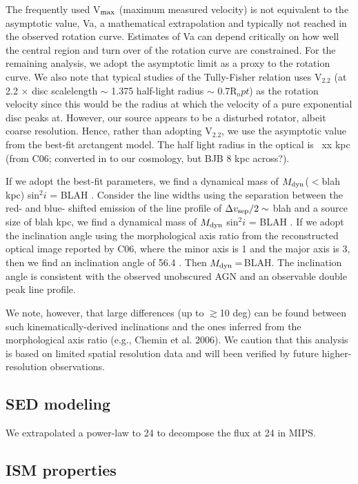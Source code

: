 \documentclass[]{emulateapj}
\begin{document}
The frequently used V$_{\rm max}$ (maximum measured velocity) is not equivalent to the
asymptotic value, Va, a mathematical extrapolation and typically not reached in
the observed rotation curve. Estimates of Va can depend critically on how well
the central region and turn over of the rotation curve are constrained. For the
remaining analysis, we adopt the asymptotic limit as a proxy to the rotation
curve. We also note that typical studies of the Tully-Fisher relation uses V$_2.2$ (at 2.2 $\times$ disc scalelength $\sim$ 1.375 half-light radius $\sim$ 0.7R$_opt$) as the rotation
velocity since this would be the radius at which the velocity of a pure
exponential disc peaks at. However, our source appears to be a disturbed
rotator, albeit coarse resolution. Hence, rather than adopting V$_2.2$, we use the
asymptotic value from the best-fit arctangent model. The half light radius in the
optical is ~xx kpc (from C06; converted in to our cosmology, but BJB 8 kpc
across?).

If we adopt the best-fit parameters, we find a dynamical mass of $M_{\rm dyn}$($<$blah kpc) sin$^2 i$ = BLAH \Msun. Consider the line widths using the separation between
the red- and blue- shifted emission of the \bco line profile of $\Delta v_{\rm sep}/2 \sim$ blah \kms and a source size of blah kpc, we find a dynamical mass of $M_{\rm dyn}$
sin$^2 i$ = BLAH \Msun. If we adopt the inclination angle using the morphological axis ratio from the
reconstructed optical image reported by C06, where the minor axis is 1 and the major axis is 3, then we find an inclination angle of 56.4
\degr. Then $M_{\rm dyn}$\,=\,BLAH. The inclination angle is consistent with the observed unobscured AGN and an observable double peak line profile.

We note, however, that large differences (up to $\gtrsim$10 deg) can be found between such kinematically-derived inclinations and the ones inferred from the morphological
axis ratio (e.g., Chemin et al. 2006). We caution that this analysis is based on limited spatial resolution data and will been verified by future higher-resolution observations.

\subsection{SED modeling} \label{sec:SED}

We extrapolated a power-law to 24 \micron
to decompose the flux at 24 \micron in MIPS.

\subsection{ISM properties}
\end{document}
